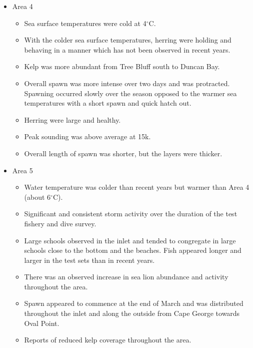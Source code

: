\begin{itemize}

\item{Area 4}

\begin{itemize}

\item Sea surface temperatures were cold at 4$^\circ\text{C}$.

\item With the colder sea surface temperatures, herring were holding and
behaving in a manner which has not been observed in recent years.

\item Kelp was more abundant from Tree Bluff south to Duncan Bay. 

\item Overall spawn was more intense over two days and was protracted.
Spawning occurred slowly over the season
opposed to the warmer sea temperatures with a short spawn and quick hatch out.

\item Herring were large and healthy.

\item Peak sounding was above average at 15k.

\item Overall length of spawn was shorter, but the layers were thicker.

\end{itemize}

\item{Area 5}

\begin{itemize}

\item Water temperature was colder than recent years but warmer than Area 4
(about 6$^\circ\text{C}$).

\item Significant and consistent storm activity
over the duration of the test fishery and dive survey.

\item Large schools observed in the inlet and tended to congregate
in large schools close to the bottom and the beaches.
Fish appeared longer and larger in the test sets than in recent years.

\item There was an observed increase in sea lion abundance and activity
throughout the area.

\item Spawn appeared to commence at the end of March and was distributed
throughout the inlet and along the outside from Cape George towards Oval Point.

\item Reports of reduced kelp coverage throughout the area.

\end{itemize}

\end{itemize}